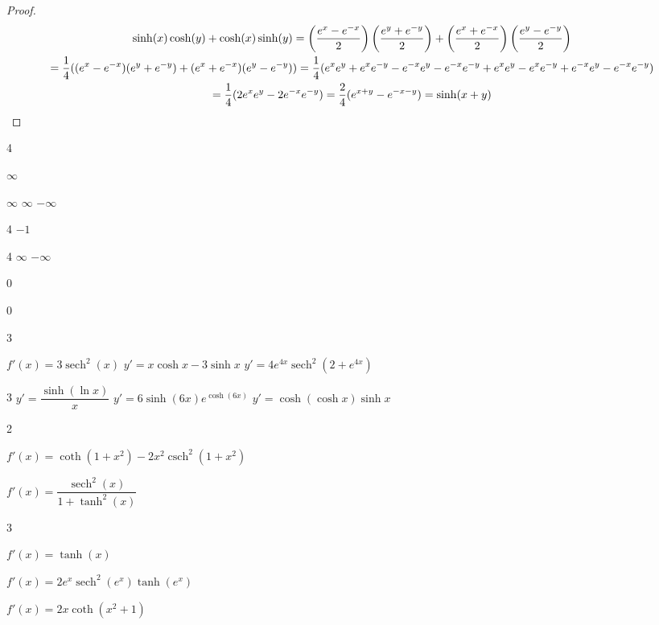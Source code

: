 \documentclass{book}
\DeclareMathOperator{\sech}{sech}
\DeclareMathOperator{\csch}{csch}
\begin{document}
\begin{appendices}
\begin{enumerate}[!HW!]
\itemspade \begin{proof}\mbox{}\vspace{-35pt}

\begin{multline*}
\sinh(x)\cosh(y)+\cosh(x)\sinh(y) = \left(\dfrac{e^x-e^{-x}}{2}\right)\left(\dfrac{e^y+e^{-y}}{2}\right)+ \left(\dfrac{e^x+e^{-x}}{2}\right)\left(\dfrac{e^y-e^{-y}}{2}\right)\\
 = \dfrac{1}{4}((e^x-e^{-x})(e^y+e^{-y}) + (e^x+e^{-x})(e^y-e^{-y})) = \dfrac{1}{4}(e^xe^y + e^xe^{-y} - e^{-x}e^y - e^{-x}e^{-y} + e^xe^y - e^xe^{-y} + e^{-x}e^y - e^{-x}e^{-y})\\
  = \dfrac{1}{4}(2e^xe^y   - 2e^{-x}e^{-y} ) = \dfrac{2}{4}(e^{x+y}- e^{-x-y}) = \sinh(x+y) \qedhere
\end{multline*}
\end{proof}

\begin{multicols}{4}
\item $\infty$
\item $\infty$
\itemspade $\infty$
\itemspade $-\infty$
\end{multicols}
\begin{multicols}{4}
\itemspade $-1$
\end{multicols}
\begin{multicols}{4}
\itemspade $\infty$
\itemspade $-\infty$
\item 0
\item 0
\end{multicols}

\begin{multicols}{3}
\item $f'(x)=3\sech^2(x)$
\itemspade $y'=x\cosh x - 3\sinh x$
\itemspade $y'=4e^{4x}\sech^2(2+e^{4x})$
\end{multicols}
\begin{multicols}{3}
\itemspade $y'=\dfrac{\sinh(\ln x)}{x}$
\itemspade $y' =6\sinh(6x)e^{\cosh(6x)}$
\itemspade $y'=\cosh(\cosh x)\sinh x$
\end{multicols}
\begin{multicols}{2}
\item $f'(x)=\coth(1+x^2)- 2x^2\csch^2(1+x^2)$
\item $f'(x)=\dfrac{\sech^2(x)}{1+\tanh^2(x)}$
\end{multicols}
\begin{multicols}{3}
\item $f'(x)=\tanh(x)$
\item $f'(x)=2e^x\sech^2(e^x)\tanh(e^x)$
\item $f'(x)=2x\coth(x^2+1)$
\end{multicols}


\end{enumerate}
\end{appendices}
\end{document}
